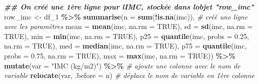 \documentclass[
]{book}
\newenvironment{Shaded}{\begin{snugshade}}{\end{snugshade}}
\newcommand{\AttributeTok}[1]{\textcolor[rgb]{0.13,0.29,0.53}{#1}}
\newcommand{\CommentTok}[1]{\textcolor[rgb]{0.56,0.35,0.01}{\textit{#1}}}
\newcommand{\ConstantTok}[1]{\textcolor[rgb]{0.56,0.35,0.01}{#1}}
\newcommand{\DocumentationTok}[1]{\textcolor[rgb]{0.56,0.35,0.01}{\textbf{\textit{#1}}}}
\newcommand{\FloatTok}[1]{\textcolor[rgb]{0.00,0.00,0.81}{#1}}
\newcommand{\FunctionTok}[1]{\textcolor[rgb]{0.13,0.29,0.53}{\textbf{#1}}}
\newcommand{\NormalTok}[1]{#1}
\newcommand{\OtherTok}[1]{\textcolor[rgb]{0.56,0.35,0.01}{#1}}
\newcommand{\SpecialCharTok}[1]{\textcolor[rgb]{0.81,0.36,0.00}{\textbf{#1}}}
\newcommand{\StringTok}[1]{\textcolor[rgb]{0.31,0.60,0.02}{#1}}
\begin{document}
\begin{Shaded}
\begin{Highlighting}[]
\DocumentationTok{\#\# On créé une 1ère ligne pour l\textquotesingle{}IMC, stockée dans l\textquotesingle{}objet "row\_imc"}
\NormalTok{row\_imc }\OtherTok{\textless{}{-}}\NormalTok{ df\_1 }\SpecialCharTok{\%\textgreater{}\%} 
  \FunctionTok{summarise}\NormalTok{(}\AttributeTok{n =} \FunctionTok{sum}\NormalTok{(}\SpecialCharTok{!}\FunctionTok{is.na}\NormalTok{(imc)), }\CommentTok{\# créé une ligne avec les paramètres}
            \AttributeTok{mean =} \FunctionTok{mean}\NormalTok{(imc, }\AttributeTok{na.rm =} \ConstantTok{TRUE}\NormalTok{),}
            \AttributeTok{sd =} \FunctionTok{sd}\NormalTok{(imc, }\AttributeTok{na.rm =} \ConstantTok{TRUE}\NormalTok{), }
            \AttributeTok{min =} \FunctionTok{min}\NormalTok{(imc, }\AttributeTok{na.rm =} \ConstantTok{TRUE}\NormalTok{), }
            \AttributeTok{p25 =} \FunctionTok{quantile}\NormalTok{(imc, }\AttributeTok{probs =} \FloatTok{0.25}\NormalTok{, }\AttributeTok{na.rm =} \ConstantTok{TRUE}\NormalTok{),}
            \AttributeTok{med =} \FunctionTok{median}\NormalTok{(imc, }\AttributeTok{na.rm =} \ConstantTok{TRUE}\NormalTok{),}
            \AttributeTok{p75 =} \FunctionTok{quantile}\NormalTok{(imc, }\AttributeTok{probs =} \FloatTok{0.75}\NormalTok{, }\AttributeTok{na.rm =} \ConstantTok{TRUE}\NormalTok{),}
            \AttributeTok{max =} \FunctionTok{max}\NormalTok{(imc, }\AttributeTok{na.rm =} \ConstantTok{TRUE}\NormalTok{)) }\SpecialCharTok{\%\textgreater{}\%}
  \FunctionTok{mutate}\NormalTok{(}\AttributeTok{var =} \StringTok{"IMC (kg/m2)"}\NormalTok{) }\SpecialCharTok{\%\textgreater{}\%} \CommentTok{\# ajoute une colonne avec le nom de variable}
  \FunctionTok{relocate}\NormalTok{(var, }\AttributeTok{.before =}\NormalTok{ n) }\CommentTok{\# déplace le nom de variable en 1ère colonne}


\end{Highlighting}
\end{Shaded}
\end{document}
